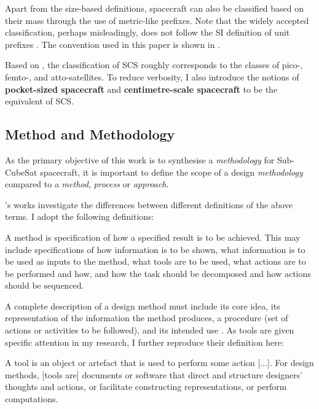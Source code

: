 \documentclass[a4paper,nobib,justified,final]{tufte-book}
\begin{document}
Apart from the size-based definitions, spacecraft can also be classified based on their mass through the use of metric-like prefixes.
Note that the widely accepted classification, perhaps misleadingly, does not follow the \acs{SI} definition of unit prefixes \cite{InternationalSystemUnits2019}. The convention used in this paper is shown in .

\begin{definition}
Based on , the classification of \acf{SCS} roughly corresponds to the classes of pico-, femto-, and atto-satellites.
To reduce verbosity, I also introduce the notions of \textbf{pocket-sized spacecraft} and \textbf{centimetre-scale spacecraft} to be the equivalent of \ac{SCS}.
\end{definition}


\subsection{Method and Methodology}

As the primary objective of this work is to synthesise a \emph{methodology} for Sub-CubeSat spacecraft, it is important to define the scope of a design \emph{methodology} compared to a \emph{method}, \emph{process} or \emph{approach}.

\citeauthor{gerickeWhatWeNeed2017}'s works \autocite{gerickeWhatWeNeed2017,gerickeElementsDesignMethod2022} investigate the differences between different definitions of the above terms. I adopt the following definitions:

\vspace*{2ex} %
\begin{definition}
	A method is specification of how a specified result is to be achieved. This may include specifications of how information is to be shown, what information is to be used as inputs to the method, what tools are to be used, what actions are to be performed and how, and how the task should be decomposed and how actions should be sequenced. \cite{gerickeWhatWeNeed2017}
\end{definition}

A complete description of a design method must include its core idea, its representation of the information the method produces, a procedure (set of actions or activities to be followed), and its intended use \autocite{gerickeElementsDesignMethod2022}. As tools are given specific attention in my research, I further reproduce their definition here:
\begin{definition}[Tool]
	A tool is an object or artefact that is used to perform some action [...]. For design methods, [tools are] documents or software that direct and structure designers' thoughts and actions, or facilitate constructing representations, or perform computations. \cite{gerickeElementsDesignMethod2022}
\end{definition}
\end{document}
